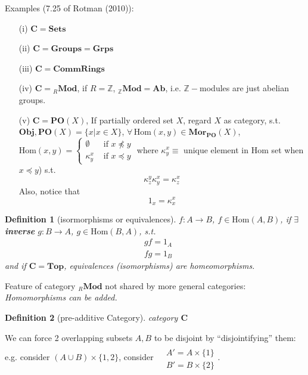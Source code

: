 \documentclass[10pt]{amsart}
\newtheorem{definition}{Definition}
\begin{document}
\begin{multicols*}{2}
Examples (7.25 of Rotman (2010)\cite{JRotman2010}): 
\begin{enumerate}
\item[(i)] $\mathbf{C} = \mathbf{\text{Sets}}$  
\item[(ii)] $\mathbf{C} = \mathbf{\text{Groups}} = \mathbf{\text{Grps}}$ 
\item[(iii)]  $\mathbf{C} = \mathbf{\text{CommRings}}$
\item[(iv)]  $\mathbf{C} = {}_R\textbf{Mod}$, if $R=\mathbb{Z}$, ${}_{\mathbb{Z}}\textbf{Mod} = \textbf{Ab}$, i.e. $\mathbb{Z}-$modules are just abelian groups.   
\item[(v)] $\mathbf{C} =\textbf{PO}(X)$, If partially ordered set $X$, regard $X$ as category, s.t. $\textbf{Obj}, \textbf{PO}(X) = \lbrace x | x\in X\rbrace$, $\forall \, \text{Hom}(x,y) \in \textbf{Mor}_{\textbf{PO}}(X)$, $\text{Hom}(x,y) = \begin{cases} \emptyset & \text{ if } x \npreceq y \\  \kappa_y^x & \text{ if } x \preceq y   \end{cases}$ where $\kappa_y^x \equiv $ unique element in $\text{Hom}$ set when $x \preceq y$) s.t. 
\[
\kappa_z^y \kappa_y^x  =\kappa_z^x
\]
Also, notice that 
\[
1_x = \kappa_x^x
\]
\end{enumerate}

\begin{definition}[isormorphisms or equivalences]
$f:A\to B$, $f\in \text{Hom}(A,B)$, if $\exists \, $ \textbf{inverse} $g:B\to A$, $g\in \text{Hom}(B,A)$, s.t. 
\[
\begin{aligned}
& gf = 1_A \\ 
& fg = 1_B
\end{aligned}
\]
and if $\mathbf{C} = \textbf{Top}$, equivalences (isomorphisms) are homeomorphisms.  
\end{definition}

Feature of category ${}_R\textbf{Mod}$ not shared by more general categories: \emph{Homomorphisms can be added.}

\begin{definition}[pre-additive Category]
category $\mathbf{C}$
\end{definition}  





We can force 2 overlapping subsets $A,B$ to be disjoint by ``disjointifying'' them: e.g. consider $(A\cup B) \times \lbrace 1,2 \rbrace$, consider $\begin{aligned} & \quad \\
& A' = A\times \lbrace 1 \rbrace \\
& B' = B\times \lbrace 2 \rbrace \end{aligned}$.


\end{multicols*}
\end{document}
